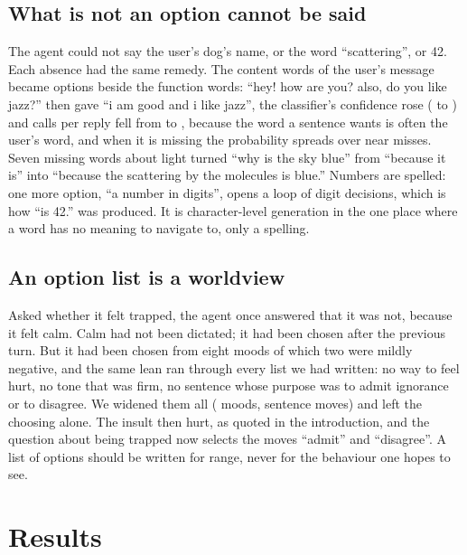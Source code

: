 \documentclass[10pt,twocolumn]{article}
\newcommand{\jev}[1]{``\textsf{#1}''}
\newcommand{\usr}[1]{``\textsf{#1}''}
\begin{document}
\subsection{What is not an option cannot be said}\label{sec:options}

The agent could not say the user's dog's name, or the word ``scattering'', or 42. Each absence had
the same remedy. The content words of the user's message became options beside the function words:
\usr{hey! how are you? also, do you like jazz?} then gave \jev{i am good and i like jazz}, the
classifier's confidence rose (\EchoOffConf{} to \EchoOnConf{}) and calls per reply fell from
\EchoOffCalls{} to \EchoOnCalls{}, because the word a sentence wants is often the user's word, and
when it is missing the probability spreads over near misses. Seven missing words about light turned
\usr{why is the sky blue} from \jev{because it is} into
\jev{because the scattering by the molecules is blue.} Numbers are spelled: one more option, ``a
number in digits'', opens a loop of digit decisions, which is how \jev{is 42.} was produced. It is
character-level generation in the one place where a word has no meaning to navigate to, only a
spelling.

\subsection{An option list is a worldview}\label{sec:worldview}

Asked whether it felt trapped, the agent once answered that it was not, because it felt calm. Calm
had not been dictated; it had been chosen after the previous turn. But it had been chosen from eight
moods of which two were mildly negative, and the same lean ran through every list we had written:
no way to feel hurt, no tone that was firm, no sentence whose purpose was to admit ignorance or to
disagree. We widened them all (\Moods{} moods, \Moves{} sentence moves) and left the choosing alone.
The insult then hurt, as quoted in the introduction, and the question about being trapped now
selects the moves ``admit'' and ``disagree''. A list of options should be written for range, never
for the behaviour one hopes to see.

\section{Results}\label{sec:results}
\end{document}
